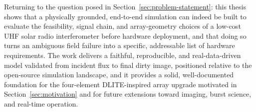 Returning to the question posed in Section~\ref{sec:problem-statement}: this thesis
shows that a physically grounded, end-to-end simulation can indeed be built to evaluate
the feasibility, signal chain, and array-geometry choices of a low-cost UHF solar radio
interferometer before hardware deployment, and that doing so turns an ambiguous field
failure into a specific, addressable list of hardware requirements. The work delivers a
faithful, reproducible, and real-data-driven model validated from incident flux to final
dirty image, positioned relative to the open-source simulation landscape, and it provides
a solid, well-documented foundation for the four-element DLITE-inspired array upgrade
motivated in Section~\ref{sec:motivation} and for future extensions toward imaging,
burst science, and real-time operation.
\clearpage

